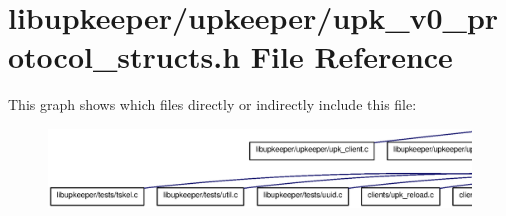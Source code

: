 \section{libupkeeper/upkeeper/upk\_\-v0\_\-protocol\_\-structs.h File Reference}
\label{upk__v0__protocol__structs_8h}
This graph shows which files directly or indirectly include this file:
\nopagebreak
\begin{figure}[H]
\begin{center}
\leavevmode
\includegraphics[width=400pt]{upk__v0__protocol__structs_8h__dep__incl}
\end{center}
\end{figure}
